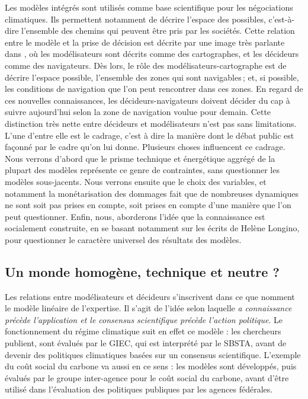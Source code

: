 Les modèles intégrés sont utilisés comme base scientifique pour les négociations climatiques. Ils permettent notamment de décrire l'espace des possibles, c'est-à-dire l'ensemble des chemins qui peuvent être pris par les sociétés. Cette relation entre le modèle et la prise de décision est décrite par une image très parlante dans \cite{edenhofer_mapmakers_2014}, où les modélisateurs sont décrits comme des cartographes, et les décideurs comme des navigateurs. Dès lors, le rôle des modélisateurs-cartographe est de décrire l'espace possible, l'ensemble des zones qui sont navigables ; et, si possible, les conditions de navigation que l'on peut rencontrer dans ces zones.  En regard de ces nouvelles connaissances, les décideurs-navigateurs doivent décider du cap à suivre aujourd'hui selon la zone de navigation voulue pour demain. Cette distinction très nette entre décideurs et modélisateurs n'est pas sans limitations. L'une d'entre elle est le cadrage, c'est à dire la manière dont le débat public est façonné par le cadre qu'on lui donne.  Plusieurs choses influencent ce cadrage. Nous verrons d'abord que le prisme technique et énergétique aggrégé de la plupart des modèles représente ce genre de contraintes, sans questionner les modèles sous-jacents. Nous verrons ensuite que le choix des variables, et notamment la monétarisation des dommages fait que de nombreuses dynamiques ne sont soit pas prises en compte, soit prises en compte d'une manière que l'on peut questionner. Enfin, nous, aborderons l'idée que la connaissance est socialement construite, en se basant notamment sur les écrits de Helène Longino, pour questionner le caractère universel des résultats des modèles. 

\subsection{Un monde homogène, technique et neutre ?}

Les relations entre modélisateurs et décideurs s'inscrivent dans ce que \cite{aykut_gouverner_nodate} nomment le modèle linéaire de l'expertise. Il s'agit de l'idée selon laquelle \emph{a connaissance précède l’application et le consensus scientifique précède l’action politique}. Le fonctionnement du régime climatique suit en effet ce modèle : les chercheurs publient, sont évalués par le GIEC, qui est interprété par le SBSTA, avant de devenir des politiques climatiques basées sur un consensus scientifique. L'exemple du coût social du carbone va aussi en ce sens : les modèles sont développés, puis évalués par le groupe inter-agence pour le coût social du carbone, avant d'être utilisé dans l'évaluation des politiques publiques par les agences fédérales. 

